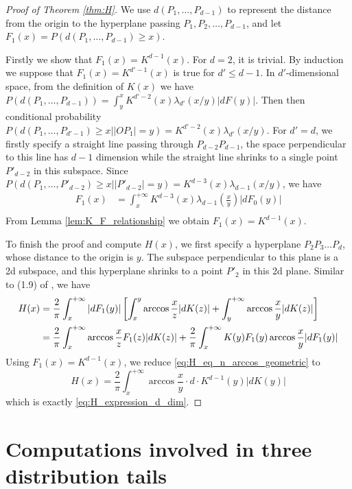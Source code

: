 \documentclass{aptpub}
\begin{document}
\begin{proof}[Proof of Theorem \ref{thm:H}]
     
We use $d(P_1,\dots, P_{d-1})$ to represent
the distance from the origin to the hyperplane passing $P_1,P_2,\dots, P_{d-1}$,
and let $F_1(x)=P(d(P_1,\dots, P_{d-1})\geq x)$.


Firstly we show that $F_1(x)=K^{d-1}(x)$.
For $d=2$, it is trivial.
By induction we suppose that $F_1(x)=K^{d'-1}(x)$ is true for
$d'\leq d-1$. In $d'$-dimensional space,
from the definition of $K(x)$ we have $
P(d(P_1, \dots, P_{d-1})) = \int_{y}^x K^{d'-2}(x)\lambda_{d'}(x/y)|dF(y)|
$.
Then then conditional probability $P(d(P_1,\dots, P_{d'-1})\geq x \Big\vert |OP_1|=y)
=K^{d'-2}(x)\lambda_{d'}(x/y)$.
For $d'=d$, 
we firstly specify a straight line passing through $P_{d-2}P_{d-1}$,
the space perpendicular 
to this line has $d-1$ dimension while the straight line shrinks to a single point $P'_{d-2}$
in this subspace. Since
$P(d(P_1,\dots,P'_{d-2})\geq x \Big\vert |P'_{d-2}|=y)=
K^{d-3}(x)\lambda_{d-1}(x/y)$,
we have
\begin{align*}
    F_1(x) &= \int_x^{+\infty} K^{d-3}(x) \lambda_{d-1}(\frac{x}{y})|dF_0(y)| \\
\end{align*}
From Lemma \ref{lem:K_F_relationship} we obtain $F_1(x) = K^{d-1}(x)$.

To finish the proof and compute $H(x)$, we first specify a hyperplane $P_2P_3\dots P_{d}$,
whose distance to the origin is $y$. The subspace perpendicular to this plane is a 2d subspace,
and this hyperplane shrinks to a point $P'_2$ in this 2d plane.
Similar to (1.9) of \cite{carnal1970konvexe}, we have
\begin{align}\label{eq:H_eq_n_arccos_geometric}
     H(x) &= \frac{2}{\pi}\int_x^{+\infty}|dF_1(y)|
     \left[ \int_x^y \arccos\frac{x}{z}|dK(z)|
     +\int_y^{+\infty}\arccos\frac{x}{y} |dK(z)|\right]\\
     &=\frac{2}{\pi}\int_x^{+\infty} \arccos\frac{x}{z}
     F_1(z)|dK(z)|+\frac{2}{\pi}\int_{x}^{+\infty} K(y)F_1(y)\arccos\frac{x}{y}|dF_1(y)| \notag 
 \end{align}
Using $F_1(x)=K^{d-1}(x)$,
we reduce \eqref{eq:H_eq_n_arccos_geometric} to
 $$
 H(x) = \frac{2}{\pi}\int_x^{+\infty}  \arccos\frac{x}{y}\cdot
 d\cdot  K^{d-1}(y) |dK(y)|
 $$
 which is exactly \eqref{eq:H_expression_d_dim}.
 
\end{proof}
\section{Computations involved in three distribution tails}
\end{document}
